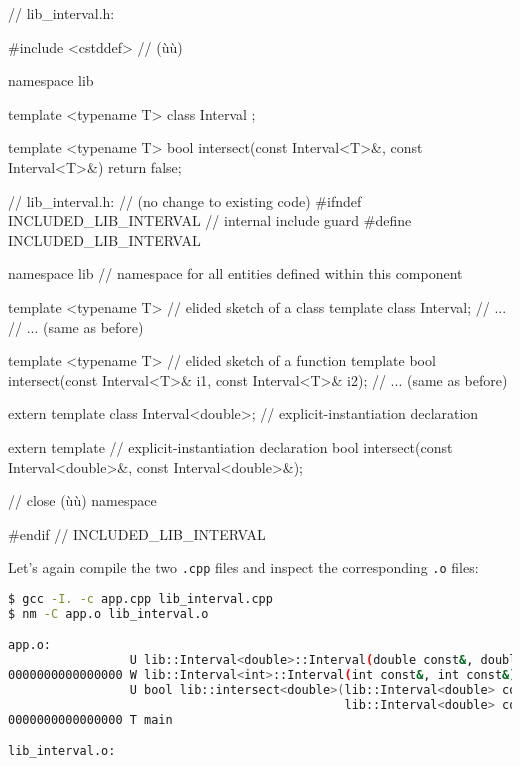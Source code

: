 \begin{emcppshiddenlisting}[emcppsbatch=e3]
// lib_interval.h:

#include <cstddef>  // (ù{}ù)

namespace lib {
template <typename T>
class Interval
{};

template <typename T>
bool intersect(const Interval<T>&, const Interval<T>&)
{
    return false;
}

}

\end{emcppshiddenlisting}
\begin{emcppslisting}[emcppsbatch=e3]
// lib_interval.h:  // (no change to existing code)
#ifndef INCLUDED_LIB_INTERVAL  // internal include guard
#define INCLUDED_LIB_INTERVAL

namespace lib  // namespace for all entities defined within this component
{

template <typename T>                    // elided sketch of a class template
class Interval;                          // ...
    // ...                       (same as before)

template <typename T>                    // elided sketch of a function template
bool intersect(const Interval<T>& i1, const Interval<T>& i2);
    // ...                       (same as before)

extern template class Interval<double>;  // explicit-instantiation declaration

extern template                          // explicit-instantiation declaration
bool intersect(const Interval<double>&, const Interval<double>&);

}  // close (ù{}ù) namespace

#endif  // INCLUDED_LIB_INTERVAL
\end{emcppslisting}

\noindent Let's again compile the two \lstinline!.cpp! files and inspect the
corresponding \lstinline!.o! files:

\begin{lstlisting}[language=bash]
$ gcc -I. -c app.cpp lib_interval.cpp
$ nm -C app.o lib_interval.o

app.o:
                 U lib::Interval<double>::Interval(double const&, double const&)
0000000000000000 W lib::Interval<int>::Interval(int const&, int const&)
                 U bool lib::intersect<double>(lib::Interval<double> const&,
                                               lib::Interval<double> const&)
0000000000000000 T main

lib_interval.o:
\end{lstlisting}

